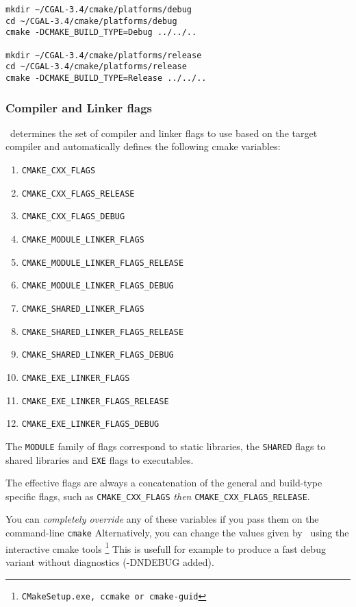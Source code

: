{\ccTexHtml{\scriptsize}{}
\begin{verbatim}
mkdir ~/CGAL-3.4/cmake/platforms/debug
cd ~/CGAL-3.4/cmake/platforms/debug
cmake -DCMAKE_BUILD_TYPE=Debug ../../..

mkdir ~/CGAL-3.4/cmake/platforms/release
cd ~/CGAL-3.4/cmake/platforms/release
cmake -DCMAKE_BUILD_TYPE=Release ../../..
\end{verbatim}
}

\subsubsection{Compiler and Linker flags}

\cmake\ determines the set of compiler and linker flags to use based on the target compiler and automatically defines
the following cmake variables:

\begin{enumerate}
\item {\tt CMAKE\_CXX\_FLAGS}
\item {\tt CMAKE\_CXX\_FLAGS\_RELEASE}
\item {\tt CMAKE\_CXX\_FLAGS\_DEBUG}
\item {\tt CMAKE\_MODULE\_LINKER\_FLAGS}
\item {\tt CMAKE\_MODULE\_LINKER\_FLAGS\_RELEASE}
\item {\tt CMAKE\_MODULE\_LINKER\_FLAGS\_DEBUG}
\item {\tt CMAKE\_SHARED\_LINKER\_FLAGS}
\item {\tt CMAKE\_SHARED\_LINKER\_FLAGS\_RELEASE}
\item {\tt CMAKE\_SHARED\_LINKER\_FLAGS\_DEBUG}
\item {\tt CMAKE\_EXE\_LINKER\_FLAGS}
\item {\tt CMAKE\_EXE\_LINKER\_FLAGS\_RELEASE}
\item {\tt CMAKE\_EXE\_LINKER\_FLAGS\_DEBUG}
\end{enumerate}

The {\tt MODULE} family of flags correspond to static libraries, the {\tt SHARED} flags to shared libraries
and {\tt EXE} flags to executables.

The effective flags are always a concatenation of the general and build-type specific flags, such as
{\tt CMAKE\_CXX\_FLAGS} {\em then} {\tt CMAKE\_CXX\_FLAGS\_RELEASE}.

You can {\em completely override} any of these variables if you pass them on the command-line {\tt cmake}
Alternatively, you can change the values given by \cmake\ using the interactive cmake tools
\footnote{{\tt CMakeSetup.exe, ccmake or cmake-guid}}  This is usefull for example to produce a fast debug
variant without diagnostics (-DNDEBUG added). 

